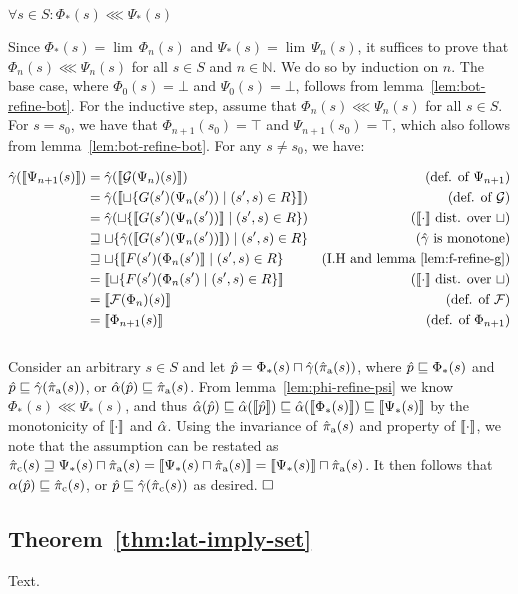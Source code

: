 
\begin{lemma} \label{lem:phi-refine-psi}
$\forall s \in S : \Phi_{*}(s) \lll \Psi_{*}(s)$
\end{lemma}

Since $\Phi_{*}(s) = \lim \, \Phi_{n}(s)$ and $\Psi_{*}(s) = \lim \, \Psi_{n}(s)$, it suffices to prove that $\Phi_{n}(s) \lll \Psi_{n}(s)$ for all $s \in S$ and $n \in \mathbb{N}$. We do so by induction on $n$. The base case, where $\Phi_{0}(s) = \bot$ and $\Psi_{0}(s) = \bot$, follows from lemma~\ref{lem:bot-refine-bot}. For the inductive step, assume that $\Phi_{n}(s) \lll \Psi_{n}(s)$ for all $s \in S$. For $s = s_{0}$, we have that $\Phi_{n+1}(s_{0}) = \top$ and $\Psi_{n+1}(s_{0}) = \top$, which also follows from lemma~\ref{lem:bot-refine-bot}. For any $s \neq s_{0}$, we have:

\begin{align*}
\hat{\gamma}(\llbracket \Psi_{n+1}(s) \rrbracket)
  & =         \hat{\gamma}(\llbracket \mathcal{G}(\Psi_{n})(s) \rrbracket)                          & (\textrm{def. of } \Psi_{n+1}) \\
  & =         \hat{\gamma}(\llbracket \sqcup \{ G(s')(\Psi_{n}(s')) \mid (s',s) \in R \} \rrbracket) & (\textrm{def. of } \mathcal{G}) \\
  & =         \hat{\gamma}(\sqcup \{ \llbracket G(s')(\Psi_{n}(s')) \rrbracket \mid (s',s) \in R \}) & (\llbracket \cdot \rrbracket \textrm{ dist. over } \sqcup) \\
  & \sqsupseteq \sqcup \{ \hat{\gamma}(\llbracket G(s')(\Psi_{n}(s')) \rrbracket) \mid (s',s) \in R \} & (\hat{\gamma} \textrm{ is monotone}) \\
  & \sqsupseteq \sqcup \{ \llbracket F(s')(\Phi_{n}(s') \rrbracket \mid (s',s) \in R \}           & (\textrm{I.H and lemma~\ref{lem:f-refine-g}}) \\
  & =         \llbracket \sqcup \{ F(s')(\Phi_{n}(s') \mid (s',s) \in R \} \rrbracket           & (\llbracket \cdot \rrbracket \textrm{ dist. over } \sqcup) \\
  & =         \llbracket \mathcal{F}(\Phi_{n})(s) \rrbracket                                   & (\textrm{def. of } \mathcal{F}) \\
  & =         \llbracket \Phi_{n+1}(s) \rrbracket                                              & (\textrm{def. of } \Phi_{n+1})
\end{align*}
\\

Consider an arbitrary $s \in S$ and let $\hat p = \Phi_{*}(s) \sqcap \hat{\gamma}(\operatorname{\hat{\pi}_{\textrm{a}}}(s))$, where $\hat p \sqsubseteq \Phi_{*}(s)$ and $\hat p \sqsubseteq \hat{\gamma}(\operatorname{\hat{\pi}_{\textrm{a}}}(s))$, or $\hat{\alpha}(\hat p) \sqsubseteq \operatorname{\hat{\pi}_{\textrm{a}}}(s)$. From lemma~\ref{lem:phi-refine-psi} we know $\Phi_{*}(s) \lll \Psi_{*}(s)$, and thus $\hat{\alpha}(\hat p) \sqsubseteq \hat{\alpha}(\llbracket \hat p \rrbracket) \sqsubseteq \hat{\alpha}(\llbracket \Phi_{*}(s) \rrbracket) \sqsubseteq \llbracket \Psi_{*}(s) \rrbracket$ by the monotonicity of $\llbracket \cdot \rrbracket$ and $\hat{\alpha}$. Using the invariance of $\operatorname{\hat{\pi}_{\textrm{a}}}(s)$ and property  of $\llbracket \cdot \rrbracket$, we note that the assumption can be restated as $\operatorname{\hat{\pi}_{\textrm{c}}}(s) \sqsupseteq \Psi_{*}(s) \sqcap \operatorname{\hat{\pi}_{\textrm{a}}}(s) = \llbracket \Psi_{*}(s) \sqcap \operatorname{\hat{\pi}_{\textrm{a}}}(s) \rrbracket = \llbracket \Psi_{*}(s) \rrbracket \sqcap \operatorname{\hat{\pi}_{\textrm{a}}}(s)$. It then follows that $\alpha(\hat p) \sqsubseteq \operatorname{\hat{\pi}_{\textrm{c}}}(s)$, or $\hat p \sqsubseteq \hat{\gamma}(\operatorname{\hat{\pi}_{\textrm{c}}}(s))$ as desired. $\qedbox$

\subsection{Theorem~\ref{thm:lat-imply-set}}

Text.

